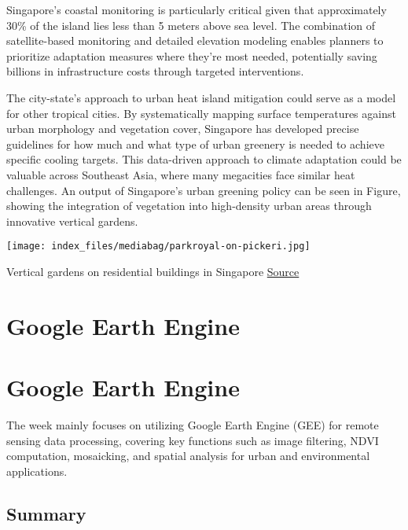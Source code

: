 \documentclass[
  letterpaper,
  DIV=11,
  numbers=noendperiod]{scrreprt}
\begin{document}
Singapore's coastal monitoring is particularly critical given that
approximately 30\% of the island lies less than 5 meters above sea
level. The combination of satellite-based monitoring and detailed
elevation modeling enables planners to prioritize adaptation measures
where they're most needed, potentially saving billions in infrastructure
costs through targeted interventions.

The city-state's approach to urban heat island mitigation could serve as
a model for other tropical cities. By systematically mapping surface
temperatures against urban morphology and vegetation cover, Singapore
has developed precise guidelines for how much and what type of urban
greenery is needed to achieve specific cooling targets. This data-driven
approach to climate adaptation could be valuable across Southeast Asia,
where many megacities face similar heat challenges. An output of
Singapore's urban greening policy can be seen in Figure, showing the
integration of vegetation into high-density urban areas through
innovative vertical gardens.

\texttt{[image: index\_files/mediabag/parkroyal-on-pickeri.jpg]}

Vertical gardens on residential buildings in Singapore
\href{https://www.crabintheair.com/wp-content/uploads/2017/02/parkroyal-on-pickering-review-e1537299078683.jpg}{Source}


\chapter{Google Earth Engine}\label{google-earth-engine}


\chapter{Google Earth Engine}\label{google-earth-engine-1}

The week mainly focuses on utilizing Google Earth Engine (GEE) for
remote sensing data processing, covering key functions such as image
filtering, NDVI computation, mosaicking, and spatial analysis for urban
and environmental applications.

\section{Summary}\label{summary-2}
\end{document}
